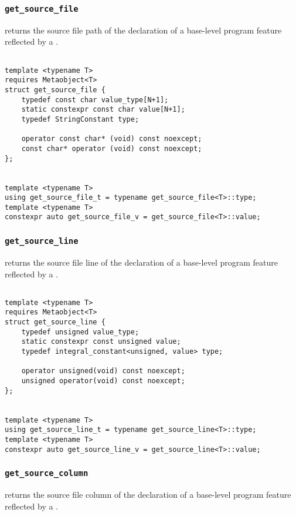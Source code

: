 
\subsubsection{\texttt{get\_source\_file}}

returns the source file path of the declaration of a base-level program feature reflected by a .

\begin{verbatim}

template <typename T>
requires Metaobject<T>
struct get_source_file {
	typedef const char value_type[N+1];
	static constexpr const char value[N+1];
	typedef StringConstant type;

	operator const char* (void) const noexcept;
	const char* operator (void) const noexcept;
};


template <typename T>
using get_source_file_t = typename get_source_file<T>::type;
template <typename T>
constexpr auto get_source_file_v = get_source_file<T>::value;

\end{verbatim}

\subsubsection{\texttt{get\_source\_line}}

returns the source file line of the declaration of a base-level program feature reflected by a .

\begin{verbatim}

template <typename T>
requires Metaobject<T>
struct get_source_line {
	typedef unsigned value_type;
	static constexpr const unsigned value;
	typedef integral_constant<unsigned, value> type;

	operator unsigned(void) const noexcept;
	unsigned operator(void) const noexcept;
};


template <typename T>
using get_source_line_t = typename get_source_line<T>::type;
template <typename T>
constexpr auto get_source_line_v = get_source_line<T>::value;

\end{verbatim}

\subsubsection{\texttt{get\_source\_column}}

returns the source file column of the declaration of a base-level program feature reflected by a .

